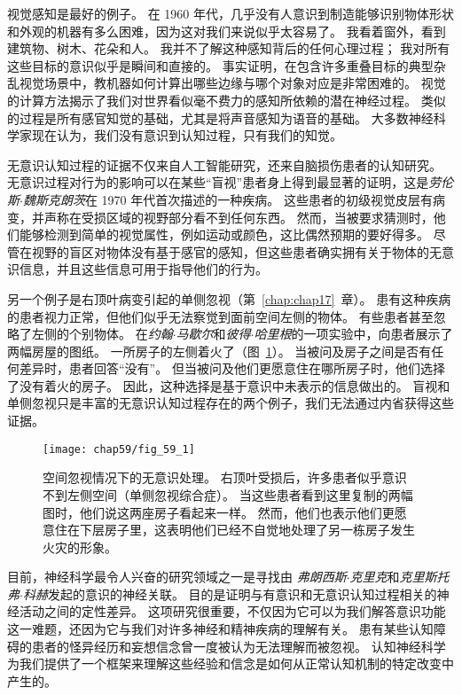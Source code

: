 视觉感知是最好的例子。
在 1960 年代，几乎没有人意识到制造能够识别物体形状和外观的机器有多么困难，因为这对我们来说似乎太容易了。
我看着窗外，看到建筑物、树木、花朵和人。
我并不了解这种感知背后的任何心理过程；
我对所有这些目标的意识似乎是瞬间和直接的。
事实证明，在包含许多重叠目标的典型杂乱视觉场景中，教机器如何计算出哪些边缘与哪个对象对应是非常困难的。
视觉的计算方法揭示了我们对世界看似毫不费力的感知所依赖的潜在神经过程。
类似的过程是所有感官知觉的基础，尤其是将声音感知为语音的基础。
大多数神经科学家现在认为，我们没有意识到认知过程，只有我们的知觉。


无意识认知过程的证据不仅来自人工智能研究，还来自脑损伤患者的认知研究。
无意识过程对行为的影响可以在某些“盲视”患者身上得到最显著的证明，这是\textit{劳伦斯$\cdot$魏斯克朗茨}在 1970 年代首次描述的一种疾病。
这些患者的初级视觉皮层有病变，并声称在受损区域的视野部分看不到任何东西。
然而，当被要求猜测时，他们能够检测到简单的视觉属性，例如运动或颜色，这比偶然预期的要好得多。
尽管在视野的盲区对物体没有基于感官的感知，但这些患者确实拥有关于物体的无意识信息，并且这些信息可用于指导他们的行为。


另一个例子是右顶叶病变引起的单侧忽视（第~\ref{chap:chap17}~章）。
患有这种疾病的患者视力正常，但他们似乎无法察觉到面前空间左侧的物体。
有些患者甚至忽略了左侧的个别物体。
在\textit{约翰$\cdot$马歇尔}和\textit{彼得$\cdot$哈里根}的一项实验中，向患者展示了两幅房屋的图纸。
一所房子的左侧着火了（图~\ref{fig:59_1}）。
当被问及房子之间是否有任何差异时，患者回答“没有”。 但当被问及他们更愿意住在哪所房子时，他们选择了没有着火的房子。
因此，这种选择是基于意识中未表示的信息做出的。
盲视和单侧忽视只是丰富的无意识认知过程存在的两个例子，我们无法通过内省获得这些证据。


\begin{figure}[htbp]
	\centering
	\texttt{[image: chap59/fig\_59\_1]}
	\caption{空间忽视情况下的无意识处理。
		右顶叶受损后，许多患者似乎意识不到左侧空间（单侧忽视综合症）。
		当这些患者看到这里复制的两幅图时，他们说这两座房子看起来一样。
		然而，他们也表示他们更愿意住在下层房子里，这表明他们已经不自觉地处理了另一栋房子发生火灾的形象\cite{marshall1988blindsight}。}
	\label{fig:59_1}
\end{figure}


目前，神经科学最令人兴奋的研究领域之一是寻找由 \textit{弗朗西斯$\cdot$克里克}和\textit{克里斯托弗$\cdot$科赫}发起的意识的神经关联。
目的是证明与有意识和无意识认知过程相关的神经活动之间的定性差异。
这项研究很重要，不仅因为它可以为我们解答意识功能这一难题，还因为它与我们对许多神经和精神疾病的理解有关。
患有某些认知障碍的患者的怪异经历和妄想信念曾一度被认为无法理解而被忽视。
认知神经科学为我们提供了一个框架来理解这些经验和信念是如何从正常认知机制的特定改变中产生的。



